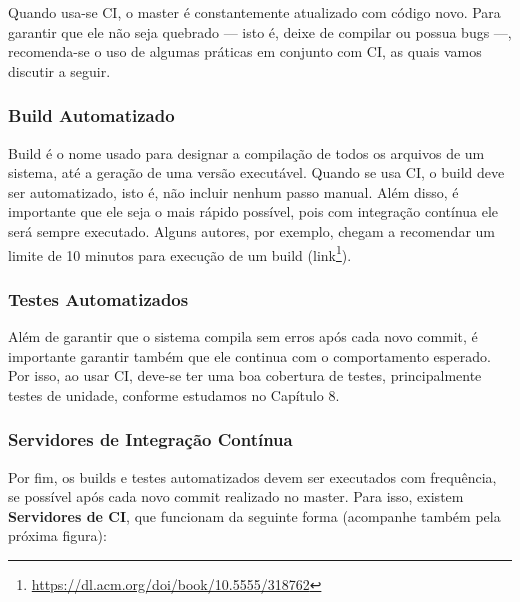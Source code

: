 \documentclass[
  11pt,
  twoside]{book}
\DeclareRobustCommand{\href}[2]{#2\footnote{\url{#1}}}
\begin{document}
Quando usa-se CI, o master é constantemente atualizado com código novo.
Para garantir que ele não seja quebrado --- isto é, deixe de compilar ou
possua bugs ---, recomenda-se o uso de algumas práticas em conjunto com
CI, as quais vamos discutir a seguir.

\hypertarget{build-automatizado}{%
\subsubsection*{Build Automatizado}\label{build-automatizado}}

Build é o nome usado para designar a compilação de todos os arquivos de
um sistema, até a geração de uma versão executável. Quando se usa CI, o
build deve ser automatizado, isto é, não incluir nenhum passo manual.
Além disso, é importante que ele seja o mais rápido possível, pois com
integração contínua ele será sempre executado. Alguns autores, por
exemplo, chegam a recomendar um limite de 10 minutos para execução de um
build (\href{https://dl.acm.org/doi/book/10.5555/318762}{link}).

\hypertarget{testes-automatizados}{%
\subsubsection*{Testes Automatizados}\label{testes-automatizados}}

Além de garantir que o sistema compila sem erros após cada novo commit,
é importante garantir também que ele continua com o comportamento
esperado. Por isso, ao usar CI, deve-se ter uma boa cobertura de testes,
principalmente testes de unidade, conforme estudamos no Capítulo 8.

\hypertarget{servidores-de-integrauxe7uxe3o-contuxednua}{%
\subsubsection*{Servidores de Integração
Contínua}\label{servidores-de-integrauxe7uxe3o-contuxednua}}


Por fim, os builds e testes automatizados devem ser executados com
frequência, se possível após cada novo commit realizado no master. Para
isso, existem \textbf{Servidores de CI}, que funcionam da seguinte forma
(acompanhe também pela próxima figura):
\end{document}
